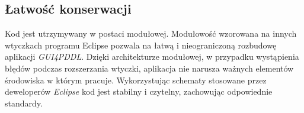 \subsection{Łatwość konserwacji}
Kod jest utrzymywany w postaci modułowej. Modułowość wzorowana na innych wtyczkach programu Eclipse pozwala na łatwą i nieograniczoną rozbudowę aplikacji \emph{GUI4PDDL}. Dzięki architekturze modułowej, w przypadku wystąpienia błędów podczas rozszerzania wtyczki, aplikacja nie narusza ważnych elementów środowiska w którym pracuje. Wykorzystując schematy stosowane przez deweloperów \emph{Eclipse} kod jest stabilny i czytelny, zachowując odpowiednie standardy.



